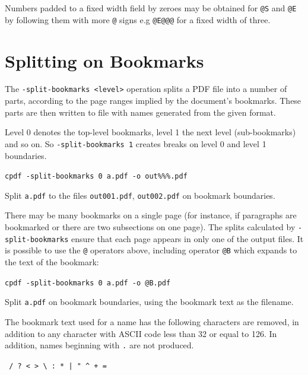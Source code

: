 \documentclass{book}
\begin{document}
\noindent Numbers padded to a fixed width field by zeroes may be obtained for \texttt{@S} and \texttt{@E} by following them with more \texttt{@} signs e.g \texttt{@E@@@} for a fixed width of three.

  \section{Splitting on Bookmarks}
  The \texttt{-split-bookmarks <level>} operation splits a PDF file into a number of
parts, according to the page ranges implied by the document's bookmarks. These
parts are then written to file with names generated from the given format.
  
Level 0 denotes the top-level bookmarks, level 1 the next level (sub-bookmarks)
and so on. So \texttt{-split-bookmarks 1} creates breaks on level 0 and level
1 boundaries.

  \begin{framed}\small
    \noindent\verb!cpdf -split-bookmarks 0 a.pdf -o out%%%.pdf!

    \vspace{2.5mm}
    \noindent Split \texttt{a.pdf} to the files \texttt{out001.pdf},
\texttt{out002.pdf} on bookmark boundaries.

  \end{framed}

\noindent There may be many bookmarks on a single page (for instance, if
paragraphs are bookmarked or there are two subsections on one page). The splits
calculated by \texttt{-split-bookmarks} ensure that each page appears in only
one of the output files.
  It is possible to use the \texttt{@} operators above, including operator \texttt{@B} which expands to the text of the bookmark:

  \begin{framed}\small
    \noindent\verb!cpdf -split-bookmarks 0 a.pdf -o @B.pdf!

    \vspace{2.5mm}
    \noindent Split \texttt{a.pdf} on bookmark boundaries, using the bookmark text as the filename.

  \end{framed}

\noindent The bookmark text used for a name has the following characters are removed, in addition to any character with ASCII code less than 32 or equal to 126. In addition, names beginning with \texttt{.} are not produced.

  \begin{framed}
  \centering
  \verb! / ? < > \ : * | " ^ + =!
  \end{framed}
\end{document}
